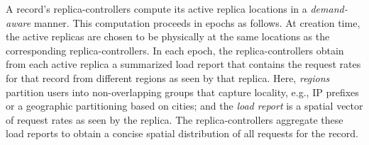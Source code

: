 



%

A record's replica-controllers compute its active replica locations in a {\em demand-aware} manner. This computation proceeds in epochs as follows. At creation time, the active replicas are chosen to be physically at the same locations as the corresponding replica-controllers. In each epoch, the replica-controllers obtain from each active replica a summarized load report that contains the request rates for that record from different {regions} as seen by that replica. Here, {\em regions} partition users into non-overlapping groups that capture locality, e.g., IP prefixes or a geographic  partitioning based on cities; and the {\em load report} is a spatial vector of request rates as seen by the replica. The replica-controllers aggregate these load reports to obtain a concise spatial distribution of all requests for the record.




\vsp

